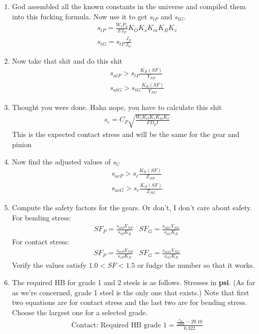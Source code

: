 \documentclass[11pt, fleqn]{article}
\begin{document}
\begin{enumerate}
    \item God assembled all the known constants in the universe and compiled them into this fucking formula. Now use it to get $s_{tP}$ and $s_{tG}$.
    \begin{align*}
        &s_{tP}=\frac{W_tP_d}{FJ_P}K_OK_sK_mK_BK_v\\
        &s_{tG}=s_{tP}\frac{J_P}{J_G}
    \end{align*}
    \item Now take that shit and do this shit
    \begin{align*}
        &s_{atP}>s_{tP}\frac{K_R(SF)}{Y_{NP}}\\
        &s_{atG}>s_{tG}\frac{K_R(SF)}{Y_{NG}}
    \end{align*}
    \item Thought you were done. Haha nope, you have to calculate this shit
    \begin{align*}
        &s_c=C_P\sqrt{\frac{W_tK_OK_sK_mK_v}{FD_pI}}
    \end{align*}
    This is the expected contact stress and will be the same for the gear and pinion
    \item Now find the adjusted values of $s_C$
    \begin{align*}
        &s_{acP}>s_{c}\frac{K_R(SF)}{Z_{NP}}\\
        &s_{acG}>s_{c}\frac{K_R(SF)}{Z_{NG}}
    \end{align*}
    \item Compute the safety factors for the gears. Or don't, I don't care about safety.\\
    For bending stress:
    \begin{align*}
        &SF_P=\frac{s_{atP}Y_{NP}}{s_{tP}K_R} &SF_G=\frac{s_{atG}Y_{NG}}{s_{tG}K_R}
    \end{align*}
    For contact stress:
    \begin{align*}
        &SF_P=\frac{s_{acP}Y_{NP}}{s_{cP}K_R} &SF_G=\frac{s_{acG}Y_{NG}}{s_{cG}K_R}
    \end{align*}
    Verify the values satisfy $1.0<SF<1.5$ or fudge the number so that it works.
    \item The required HB for grade 1 and 2 steels is as follows. Stresses in \textbf{psi}. (As far as we're concerned, grade 1 steel is the only one that exists.) Note that first two equations are for contact stress and the last two are for bending stress. Choose the largest one for a selected grade.
    \begin{align*}
        &\text{Contact: Required HB grade 1}=\frac{\frac{s_{ac}}{1000}-29.10}{0.322}\\

\end{align*}
\end{enumerate}
\end{document}
